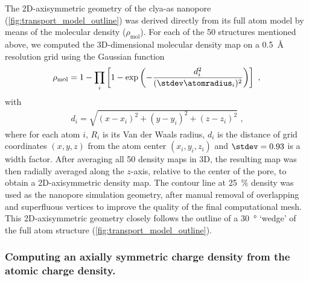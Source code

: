 The 2D-axisymmetric geometry of the \gls{clya-as} nanopore (\cref{fig:transport_model_outline}) was derived
directly from its full atom model by means of the molecular density ($\rho_\text{mol}$). For each of the 50
structures mentioned above, we computed the 3D-dimensional molecular density map on a \SI{0.5}{\angstrom}
resolution grid using the Gaussian function~\cite{Li-2013}
%
\begin{align}\label{eq:denspore}
  \rho_\text{mol} = 1 - \displaystyle\prod_{i} \left[ 1 - 
    \exp{\left(-\dfrac{d_i^2}{(\stdev\atomradius_{i})^2}\right)} \right]
    \text{ ,}
\end{align}
%
with
%
\begin{align}
  d_i = \sqrt{(x-x_i)^2 + (y-y_i)^2 + (z-z_i)^2}
  \text{ ,}
\end{align}
%
where for each atom $i$, $R_i$ is its Van der Waals radius, $d_i$ is the distance of grid coordinates $(x, y,
z)$ from the atom center $(x_i, y_i, z_i)$ and $\stdev = 0.93$ is a width factor. After averaging all 50
density maps in 3D, the resulting map was then radially averaged along the $z$-axis, relative to the center of
the pore, to obtain a 2D-axisymmetric density map. The contour line at \SI{25}{\percent} density was used as
the nanopore simulation geometry, after manual removal of overlapping and superfluous vertices to improve the
quality of the final computational mesh. This 2D-axisymmetric geometry closely follows the outline of a
\SI{30}{\degree} `wedge' of the full atom structure (\cref{fig:transport_model_outline}).

\subsubsection{Computing an axially symmetric charge density from the atomic charge density.}
%

